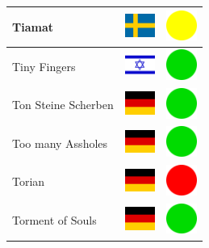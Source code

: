 \documentclass[12pt, a4paper, twoside]{report}
\begin{document}
\begin{center}
\begin{longtable}{|p{5cm}|p{2cm}|p{2cm}|}
 Tiamat                                                     & \includegraphics[width=1cm]{../4x3/se} &   \includegraphics[width=1cm]{../likes/m} \\ \hline
 Tiny Fingers                                               & \includegraphics[width=1cm]{../4x3/il} &   \includegraphics[width=1cm]{../likes/y} \\ \hline
 Ton Steine Scherben                                        & \includegraphics[width=1cm]{../4x3/de} &   \includegraphics[width=1cm]{../likes/y} \\ \hline
 Too many Assholes                                          & \includegraphics[width=1cm]{../4x3/de} &   \includegraphics[width=1cm]{../likes/y} \\ \hline
 Torian                                                     & \includegraphics[width=1cm]{../4x3/de} &   \includegraphics[width=1cm]{../likes/n} \\ \hline
 Torment of Souls                                           & \includegraphics[width=1cm]{../4x3/de} &   \includegraphics[width=1cm]{../likes/y} \\ \hline

\end{longtable}
\end{center}
\end{document}
